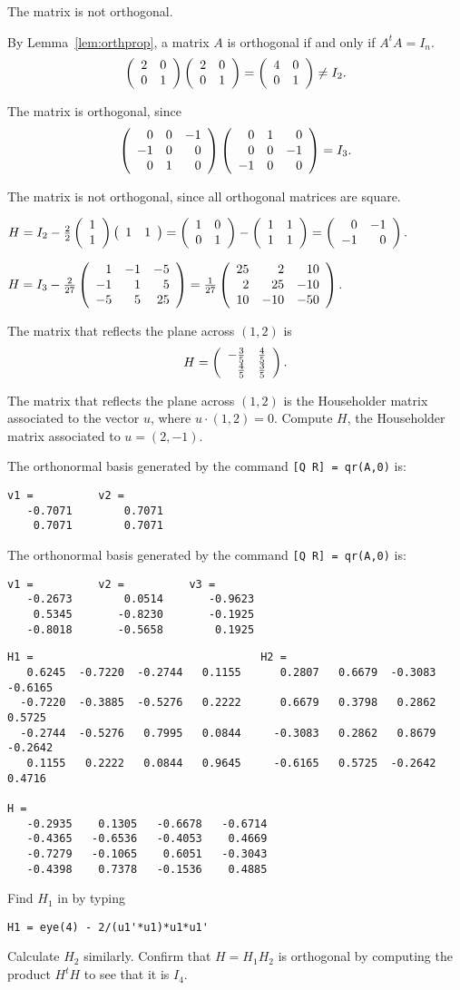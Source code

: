 \documentclass{ximera}
\begin{document}
 \ans The matrix is not orthogonal.

\soln By Lemma~\ref{lem:orthprop}, a matrix
$A$ is orthogonal if and only if $A^tA = I_n$.
\[
\left(\begin{array}{rr} 2 & 0\\ 0 &1\end{array}\right)\left(\begin{array}{rr} 2 & 0\\ 0 &1\end{array}\right) = \left(\begin{array}{rr} 4 & 0\\ 0 &1\end{array}\right) \neq I_2.
\]

 The matrix is orthogonal, since
\[
\left(\begin{array}{rrr} 0 & 0 & -1 \\ -1 & 0 & 0 \\ 0 & 1 & 0\end{array}\right)
\left(\begin{array}{rrr} 0 & 1 & 0 \\ 0 & 0 & -1 \\ -1 & 0 & 0\end{array}\right) =
I_3.
\]

 The matrix is not orthogonal, since all orthogonal matrices
are square.

$H = I_2 - \frac{2}{2}\left(\begin{array}{r} 1 \\ 1\end{array}\right)\left(\begin{array}{rr} 1 & 1
\end{array}\right) = \left(\begin{array}{rr} 1 & 0\\ 0 &1\end{array}\right) - \left(\begin{array}{rr} 1 & 1\\ 1 &1\end{array}\right)
= \left(\begin{array}{rr} 0 & -1\\ -1 &0\end{array}\right).$

$H = I_3 - \frac{2}{27}\left(\begin{array}{rrr} 1 & -1 & -5 \\ -1 & 1 & 5 \\ -5 & 5 & 25\end{array}\right)
= \frac{1}{27}\left(\begin{array}{rrr} 25 & 2 & 10 \\ 2 & 25 & -10 \\ 10 & -10 & -50\end{array}\right)$.

\ans The matrix that reflects the plane across $(1,2)$ is
\[
H = \left(\begin{array}{rr} -\frac{3}{5} & \frac{4}{5}\\ \frac{4}{5} &\frac{3}{5}\end{array}\right).
\]

\soln The matrix that reflects the plane across $(1,2)$ is the
Householder matrix associated to the vector $u$, where $u \cdot (1,2)
= 0$.  Compute $H$, the Householder matrix associated to $u = (2,-1)$.

The orthonormal basis generated by the command {\tt [Q R] = qr(A,0)} is:
\begin{verbatim}
v1 =          v2 =
   -0.7071        0.7071
    0.7071        0.7071
\end{verbatim}

\newpage
{}
The orthonormal basis generated by the command {\tt [Q R] = qr(A,0)} is:
\begin{verbatim}
v1 =          v2 =          v3 = 
   -0.2673        0.0514       -0.9623
    0.5345       -0.8230       -0.1925
   -0.8018       -0.5658        0.1925
\end{verbatim}

\ans
\begin{verbatim}
H1 =                                   H2 =
   0.6245  -0.7220  -0.2744   0.1155      0.2807   0.6679  -0.3083  -0.6165
  -0.7220  -0.3885  -0.5276   0.2222      0.6679   0.3798   0.2862   0.5725
  -0.2744  -0.5276   0.7995   0.0844     -0.3083   0.2862   0.8679  -0.2642
   0.1155   0.2222   0.0844   0.9645     -0.6165   0.5725  -0.2642   0.4716

H =
   -0.2935    0.1305   -0.6678   -0.6714
   -0.4365   -0.6536   -0.4053    0.4669
   -0.7279   -0.1065    0.6051   -0.3043
   -0.4398    0.7378   -0.1536    0.4885
\end{verbatim}

\soln Find $H_1$ in \Matlab by typing
\begin{verbatim}
H1 = eye(4) - 2/(u1'*u1)*u1*u1'
\end{verbatim}

Calculate $H_2$ similarly.  Confirm that $H = H_1H_2$ is orthogonal by
computing the product $H^tH$ to see that it is $I_4$.
\end{document}
